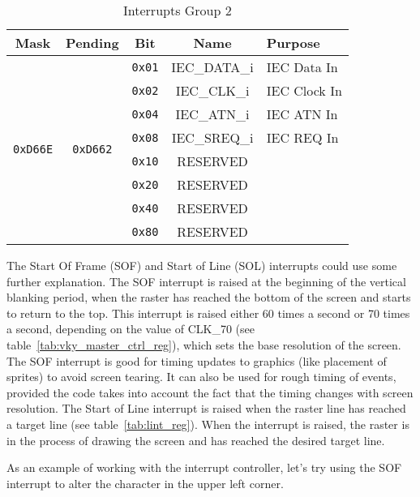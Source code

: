 \begin{table}[ht]
	\begin{center}
		\begin{tabular}{| c | c | c | c | l |} \hline
            Mask & Pending & Bit & Name & Purpose \\ \hline\hline
            \multirow{8}{*}{{\tt 0xD66E}} & \multirow{8}{*}{{\tt 0xD662}} & \verb+0x01+ & IEC\_DATA\_i & IEC Data In \\ \cline{3-5}
            & & \verb+0x02+ & IEC\_CLK\_i & IEC Clock In  \\ \cline{3-5}
            & & \verb+0x04+ & IEC\_ATN\_i & IEC ATN In  \\ \cline{3-5}
            & & \verb+0x08+ & IEC\_SREQ\_i & IEC REQ In  \\ \cline{3-5}
            & & \verb+0x10+ & RESERVED & \\ \cline{3-5}
            & & \verb+0x20+ & RESERVED & \\ \cline{3-5}
            & & \verb+0x40+ & RESERVED & \\ \cline{3-5}
            & & \verb+0x80+ & RESERVED & \\ \hline
        \end{tabular}
    \end{center}
	\caption{Interrupts Group 2}
	\label{tab:interrupts_2}
\end{table}

The Start Of Frame (SOF) and Start of Line (SOL) interrupts could use some further explanation. The SOF interrupt is raised at the beginning of the vertical blanking period, when the raster has reached the bottom of the screen and starts to return to the top. This interrupt is raised either 60 times a second or 70 times a second, depending on the value of CLK\_70 (see table~\ref{tab:vky_master_ctrl_reg}), which sets the base resolution of the screen. The SOF interrupt is good for timing updates to graphics (like placement of sprites) to avoid screen tearing. It can also be used for rough timing of events, provided the code takes into account the fact that the timing changes with screen resolution. The Start of Line interrupt is raised when the raster line has reached a target line (see table~\ref{tab:lint_reg}). When the interrupt is raised, the raster is in the process of drawing the screen and has reached the desired target line.

As an example of working with the interrupt controller, let's try using the SOF interrupt to alter the character in the upper left corner.

